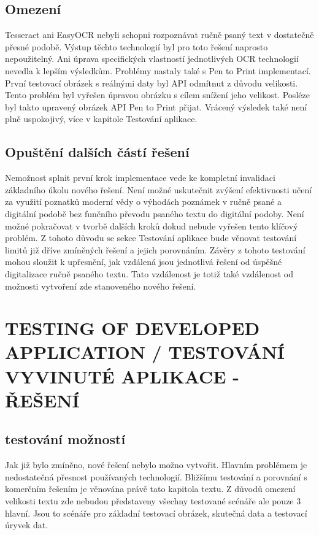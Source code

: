 \documentclass[journal]{IEEEtran}
\begin{document}
\subsection{Omezení}
Tesseract ani EasyOCR nebyli schopni rozpoznávat ručně psaný text v dostatečně přesné podobě.
Výstup těchto technologií byl pro toto řešení naprosto nepoužitelný.
Ani úprava specifických vlastností jednotlivých \ac{OCR} technologií nevedla k lepším výsledkům.
Problémy nastaly také s Pen to Print implementací.
První testovací obrázek s reálnými daty byl \ac{API} odmítnut z důvodu velikosti.
Tento problém byl vyřešen úpravou obrázku s cílem snížení jeho velikost.
Posléze byl takto upravený obrázek \ac{API} Pen to Print přijat.
Vrácený výsledek také není plně uspokojivý, více v kapitole Testování aplikace.

\subsection{Opuštění dalších částí řešení}
Nemožnost splnit první krok implementace vede ke kompletní invalidaci základního úkolu nového řešení.
Není možné uskutečnit zvýšení efektivnosti učení za využití poznatků moderní vědy o výhodách poznámek v ručně psané a digitální podobě bez funčního převodu psaného textu do digitální podoby.
Není možné pokračovat v tvorbě dalších kroků dokud nebude vyřešen tento klíčový problém.
Z tohoto důvodu se  sekce Testování aplikace bude věnovat testování limitů již dříve zmíněných řešení a jejich porovnáním.
Závěry z tohoto testování mohou sloužit k upřesnění, jak vzdálená jsou jednotlivá řešení od úspěšné digitalizace ručně psaného textu.
Tato vzdálenost je totiž také vzdálenost od možnosti vytvoření zde stanoveného nového řešení.


\section{TESTING OF DEVELOPED APPLICATION / TESTOVÁNÍ VYVINUTÉ APLIKACE - ŘEŠENÍ}

\subsection{testování možností}
Jak již bylo zmíněno, nové řešení nebylo možno vytvořit.
Hlavním problémem je nedostatečná přesnost používaných technologií.
Bližšímu testování a porovnání s komerčním řešením je věnována právě tato kapitola textu.
Z důvodů omezení velikosti textu zde nebudou představeny všechny testované scénáře ale pouze 3 hlavní.
Jsou to scénáře pro základní testovací obrázek, skutečná data a testovací úryvek dat.
\end{document}
